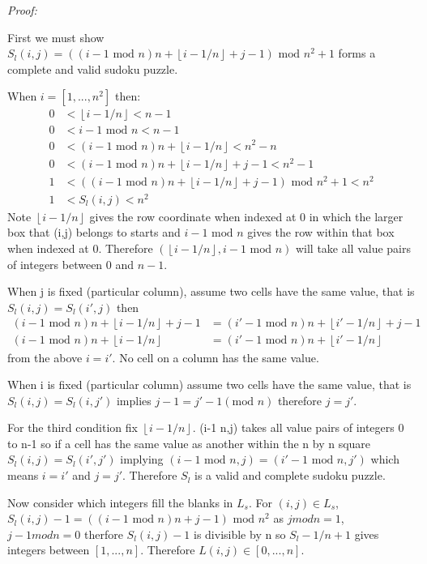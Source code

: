\documentclass[a4paper,11pt]{report}
\newcounter{row}
\newcounter{col}
\begin{document}
\textit{Proof:}

First we must show $S_l(i,j)=((i-1 \text{ mod } n)n + \left\lfloor{i-1/n}\right\rfloor+j-1)\text{ mod } n^2 +1$ forms a complete and valid sudoku puzzle.

When $i=[1,...,n^2]$ then:
\begin{align}
	0&<\left\lfloor{i-1/n}\right\rfloor<n-1\\
	0&<i-1 \text{ mod } n<n-1\\
	0&<(i-1 \text{ mod } n)n + \left\lfloor{i-1/n}\right\rfloor<n^2-n\\
	0&<(i-1 \text{ mod } n)n + \left\lfloor{i-1/n}\right\rfloor+j-1<n^2-1\\
	1&<((i-1 \text{ mod } n)n + \left\lfloor{i-1/n}\right\rfloor+j-1)\text{ mod } n^2 +1<n^2\\
	1&<S_l(i,j)<n^2
\end{align} 
Note $\left\lfloor{i-1/n}\right\rfloor$ gives the row coordinate when indexed at 0 in which the larger box that (i,j) belongs to starts and $i-1 \text{ mod } n$ gives the row within that box when indexed at 0. Therefore $(\left\lfloor{i-1/n}\right\rfloor,i-1 \text{ mod } n)$ will take all value pairs of integers between 0 and $n-1$.

When j is fixed (particular column), assume two cells have the same value, that is $S_l(i,j)=S_l(i',j)$ then
\begin{align}
(i-1 \text{ mod } n)n + \left\lfloor{i-1/n}\right\rfloor+j-1 &= (i'-1 \text{ mod } n)n +
\left\lfloor{i'-1/n}\right\rfloor+j-1\\
	(i-1 \text{ mod } n)n + \left\lfloor{i-1/n}\right\rfloor &= (i'-1 \text{ mod } n)n + \left\lfloor{i'-1/n}\right\rfloor
\end{align}
from the above $i=i'$. No cell on a column has the same value.

When i is fixed (particular column) assume two cells have the same value, that is $S_l(i,j)=S_l(i,j')$ implies $j-1=j'-1 (\text{mod }n)$ therefore $j=j'$.

For the third condition fix $\left\lfloor{i-1/n}\right\rfloor$. (i-1  n,j) takes all value pairs of integers 0 to n-1 so if a cell has the same value as another within the n by n square $S_l(i,j)=S_l(i',j')$ implying $(i-1 \text{ mod }n,j)=(i'-1 \text{ mod } n,j')$ which means $i=i'$ and $j=j'$. Therefore $S_l$ is a valid and complete sudoku puzzle.

Now consider which integers fill the blanks in $L_s$. For $(i,j)\in L_s$, $S_l(i,j)-1= ((i-1 \text{ mod } n)n+j-1)\text{ mod } n^2$ as $j mod n=1$, $j-1modn=0$ therfore $S_l(i,j)-1$ is divisible by n so $S_l-1/n+1$ gives integers between $[1,...,n]$.
Therefore $L(i,j) \in [0,...,n]$.
\end{document}
